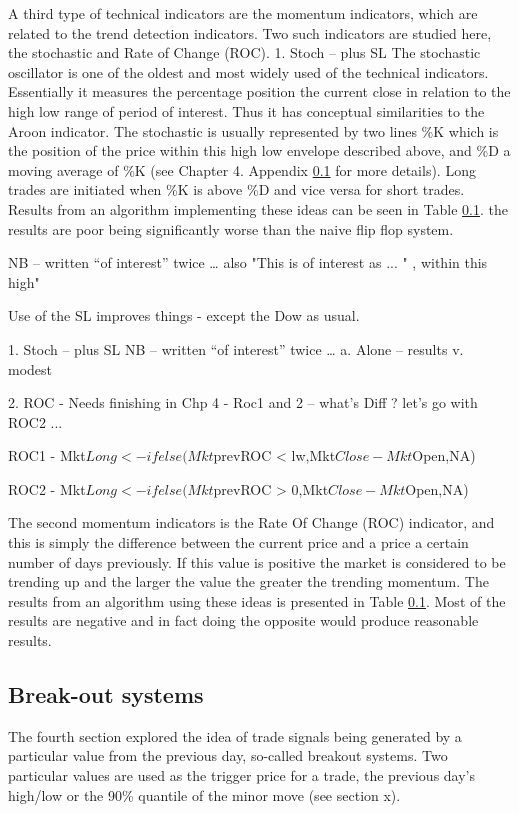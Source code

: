 A third type of technical indicators are the momentum indicators, which are related to the trend detection indicators. Two such indicators are studied here, the stochastic and Rate of Change (ROC). 
1.	Stoch – plus SL
The stochastic oscillator is one of the oldest and most widely used of the technical indicators. Essentially it measures the percentage position the current close in relation to the high low range of period of interest. Thus it has conceptual similarities to the Aroon indicator. The stochastic is usually represented by two lines \%K which is the position of the price within this high low envelope described above, and \%D a moving average of \%K (see Chapter 4.  Appendix \ref{} for more details). Long trades are initiated when \%K is above \%D and vice versa for short trades. Results from an algorithm implementing these ideas can be seen in Table \ref{}. the results are poor being significantly worse than the naive flip flop system. 

NB – written “of interest” twice … also "This is of interest as ... " , within this high"

Use of the SL improves things - except the Dow as usual.

1.	Stoch – plus SL
NB – written “of interest” twice …
a.	Alone – results v. modest


2.	ROC
-	Needs finishing in Chp 4
-	Roc1 and 2 – what's Diff ? let's go with ROC2 ...

ROC1 - Mkt$Long <- ifelse(Mkt$prevROC < lw,Mkt$Close-Mkt$Open,NA)

ROC2 - Mkt$Long <- ifelse(Mkt$prevROC > 0,Mkt$Close-Mkt$Open,NA)

The second momentum indicators is the Rate Of Change (ROC) indicator, and this is simply the difference between the current price and a price a certain number of days previously. If this value is positive the market is considered to be trending up and the larger the value the greater the trending momentum. The results from an algorithm using these ideas is presented in Table \ref{}. Most of the results are negative and in fact doing the opposite would produce reasonable results.


\subsection{Break-out systems}

The fourth section explored the idea of trade signals being generated by a particular value from the previous day, so-called breakout systems. Two particular values are used as the trigger price for a trade, the previous day's high/low or the 90\% quantile of the minor move (see section x). 

